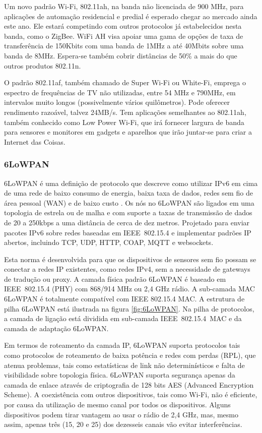 Um novo padrão Wi-Fi, 802.11ah, na banda não licenciada de 900 MHz,
para aplicações de automação residencial e predial é esperado chegar
ao mercado ainda este ano\cite{wifi:zigbee}. Ele estará competindo
com outros protocolos já estabelecidos nesta banda, como o ZigBee.
WiFi AH visa apoiar uma gama de opções de taxa de transferência de
150Kbits com uma banda de 1MHz a até 40Mbits sobre uma banda de 8MHz.
Espera-se também cobrir distâncias de 50\% a mais do que outros produtos
802.11n.

O padrão 802.11af\cite{IEEE80211ah}, também chamado de Super Wi-Fi
ou White-Fi, emprega o espectro de frequências de TV não utilizadas,
entre 54 MHz e 790MHz, em intervalos muito longos (possivelmente vários
quilômetros). Pode oferecer rendimento razoável, talvez 24MB/s. Tem
aplicações semelhantes ao 802.11ah, também conhecido como Low Power
Wi-Fi, que irá fornecer largura de banda para sensores e monitores
em gadgets e aparelhos que irão juntar-se para criar a Internet das
Coisas.

\subsubsection{6LoWPAN}

6LoWPAN é uma definição de protocolo que descreve como utilizar IPv6
em cima de uma rede de baixo consumo de energia, baixa taxa de dados,
redes sem fio de área pessoal (WAN) e de baixo custo \cite{ZShelby2009}.
Os nós no 6LoWPAN são ligados em uma topologia de estrela ou de malha
e com suporte a taxas de transmissão de dados de 20 a 250kbps a uma
distância de cerca de dez metros. Projetado para enviar pacotes IPv6
sobre redes baseadas em IEEE~802.15.4 e implementar padrões IP abertos,
incluindo TCP, UDP, HTTP, COAP, MQTT e websockets.

Esta norma é desenvolvida para que os dispositivos de sensores sem
fio possam se conectar a redes IP existentes, como redes IPv4, sem
a necessidade de gateways de tradução ou proxy\cite{ZShelby2009}.
A camada física padrão 6LoWPAN é baseado em IEEE~802.15.4 (PHY) com
868/914 MHz ou 2,4 GHz rádio. A sub-camada MAC 6LoWPAN é totalmente
compatível com IEEE 802.15.4 MAC\cite{molisch2004ieee}. A estrutura
de pilha 6LoWPAN está ilustrada na figura \ref{fig:6LoWPAN}. Na pilha
de protocolos, a camada de ligação está dividida em sub-camada IEEE~802.15.4~MAC
e da camada de adaptação 6LoWPAN\cite{ZShelby2009}.

Em termos de roteamento da camada IP, 6LoWPAN suporta protocolos tais
como protocolos de roteamento de baixa potência e redes com perdas
(RPL)\cite{hui2012routing}, que atenua problemas, tais como estatísticas
de link não determinísticos e falta de visibilidade sobre topologia
física. 6LoWPAN suporta segurança apenas da camada de enlace através
de criptografia de 128 bits AES (Advanced Encryption Scheme). A coexistência
com outros dispositivos, tais como Wi-Fi, não é eficiente, por causa
da utilização de mesmo canal por todos os dispositivos. Alguns dispositivos
podem tirar vantagem ao usar o rádio de 2,4 GHz, mas, mesmo assim,
apenas três (15, 20 e 25) dos dezesseis canais vão evitar interferências\cite{angrisani2008experimental}.

